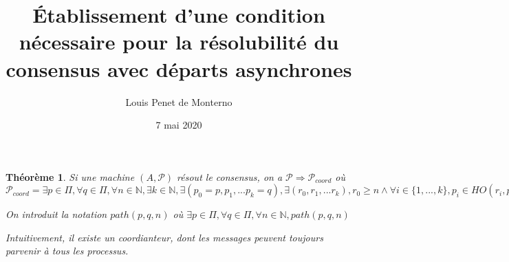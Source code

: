 \documentclass{article}
\title{Établissement d'une condition nécessaire pour la résolubilité du consensus avec départs asynchrones}
\date{7 mai 2020}
\author{Louis Penet de Monterno}
\newtheorem{lemma}{Théorème}
\begin{document}
\maketitle

\begin{lemma}

Si une machine $(A, \mathcal{P})$ résout le consensus, on a
$\mathcal{P} \Rightarrow \mathcal{P}_{coord}$ où $\mathcal{P}_{coord} = \exists p \in \Pi,
\forall q \in \Pi, \forall n \in \mathds{N}, \exists k \in \mathds{N},
\exists (p_0 = p, p_1, ... p_k = q), \exists (r_0, r_1, ... r_k), r_0 \geq n
\wedge \forall i \in \{1, ..., k\}, p_i \in HO(r_i, p_{i-1}) \wedge r_i > r_{i-1}$

On introduit la notation $path(p, q, n)$ où
$\exists p \in \Pi, \forall q \in \Pi, \forall n \in \mathds{N}, path(p, q, n)$ 

Intuitivement, il existe un coordianteur, dont les messages peuvent toujours parvenir à tous les processus.

\end{lemma}
\end{document}
